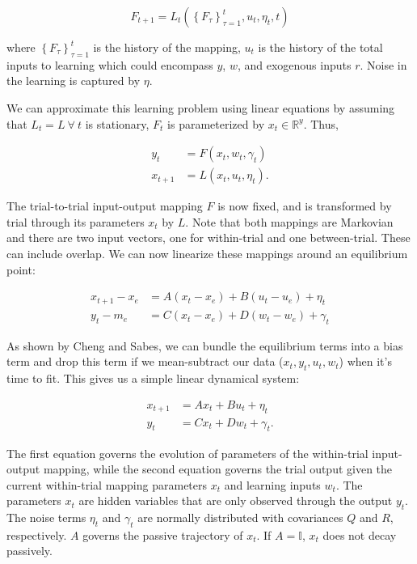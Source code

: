 \documentclass[../main.tex]{subfiles}
\begin{document}
\[F_{t+1} = L_t\left(\left\{F_\tau\right\}_{\tau=1}^{t}, u_t, \eta_t, t\right)\]

where \(\left\{F_\tau\right\}_{\tau=1}^{t}\) is the history of the
mapping, \(u_t\) is the history of the total inputs to learning which
could encompass \(y\), \(w\), and exogenous inputs \(r\). Noise in the
learning is captured by \(\eta\).

We can approximate this learning problem using linear equations by
assuming that \(L_t=L \ \forall \ t\) is stationary, \(F_t\) is
parameterized by \(x_t\in\mathbb{R}^y\). Thus,

\[
\begin{aligned}
y_t &= F(x_t, w_t, \gamma_t) \\
x_{t+1} &= L(x_t, u_t, \eta_t).
\end{aligned}
\]

The trial-to-trial input-output mapping \(F\) is now fixed, and is
transformed by trial through its parameters \(x_t\) by \(L\). Note that
both mappings are Markovian and there are two input vectors, one for
within-trial and one between-trial. These can include overlap. We can
now linearize these mappings around an equilibrium point:

\[
\begin{aligned}
x_{t+1} - x_e &= A(x_t-x_e) + B(u_t-u_e) + \eta_t \\
y_t - m_e &= C(x_t-x_e) + D(w_t-w_e) + \gamma_t
\end{aligned}
\]

As shown by Cheng and Sabes, we can bundle the equilibrium terms into a
bias term and drop this term if we mean-subtract our data
(\(x_t, y_t, u_t, w_t\)) when it's time to fit. This gives us a simple
linear dynamical system:

\[
\begin{aligned}
x_{t+1} &= Ax_t + Bu_t + \eta_t \\
y_t &= Cx_t + Dw_t + \gamma_t.
\end{aligned}
\]

The first equation governs the evolution of parameters of the
within-trial input-output mapping, while the second equation governs the
trial output given the current within-trial mapping parameters \(x_t\)
and learning inputs \(w_t\). The parameters \(x_t\) are hidden variables
that are only observed through the output \(y_t\). The noise terms
\(\eta_t\) and \(\gamma_t\) are normally distributed with covariances
\(Q\) and \(R\), respectively. \(A\) governs the passive trajectory of
\(x_t\). If \(A=\mathbb{I}\), \(x_t\) does not decay passively.
\end{document}

